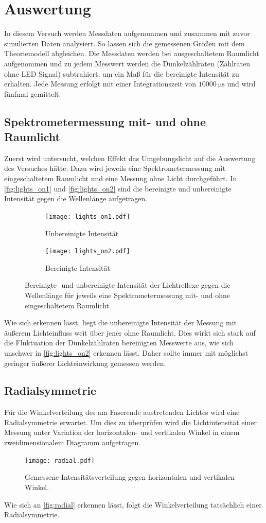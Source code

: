 \section{Auswertung}
\label{sec:Auswertung}
In diesem Versuch werden Messdaten aufgenommen und zusammen mit zuvor simulierten Daten analysiert. So lassen sich die gemessenen Größen mit dem Theoriemodell abgleichen.
Die Messdaten werden bei ausgeschaltetem Raumlicht aufgenommen und zu jedem Messwert werden die Dunkelzählraten (Zählraten ohne LED Signal) subtrahiert, um 
ein Maß für die bereinigte Intensität zu erhalten. Jede Messung erfolgt mit einer Integrationszeit von $\qty{10000}{\micro\second}$ und wird fünfmal gemittelt.

\subsection{Spektrometermessung mit- und ohne Raumlicht}
\label{sec:Spektrometermessung}
Zuerst wird untersucht, welchen Effekt das Umgebungslicht auf die Auswertung des Versuches hätte. Dazu wird jeweils eine Spektrometermessung mit eingeschaltetem Raumlicht 
und eine Messung ohne Licht durchgeführt. In \autoref{fig:lights_on1} und \autoref{fig:lights_on2} sind die bereinigte und unbereinigte Intensität gegen die Wellenlänge aufgetragen.
\begin{figure}
  \centering
  \begin{subfigure}{0.7\textwidth}
    \texttt{[image: lights\_on1.pdf]}
    \caption{Unbereinigte Intensität}
    \label{fig:lights_on1}
  \end{subfigure}
  \hfill
  \begin{subfigure}{0.7\textwidth}
    \texttt{[image: lights\_on2.pdf]}
    \caption{Bereinigte Intensität}
    \label{fig:lights_on2}
  \end{subfigure}
  \caption{Bereinigte- und unbereinigte Intensität der Lichtreflexe gegen die Wellenlänge für jeweils eine Spektrometermessung mit- und ohne eingeschaltetem Raumlicht.}
  \label{fig:lights_on}
\end{figure}
Wie sich erkennen lässt, liegt die unbereinigte Intensität der Messung mit äußerem Lichteinfluss weit über jener ohne Raumlicht. Dies wirkt sich stark auf die Fluktuation 
der Dunkelzählraten bereinigten Messwerte aus, wie sich unschwer in \autoref{fig:lights_on2} erkennen lässt. Daher sollte immer mit möglichst geringer äußerer Lichteinwirkung gemessen werden.

\subsection{Radialsymmetrie}
Für die Winkelverteilung des am Faserende austretenden Lichtes wird eine Radialsymmetrie erwartet. Um dies zu überprüfen wird die Lichtintensität einer Messung unter Variation
der horizontalen- und vertikalen Winkel in einem zweidimensionalem Diagramm aufgetragen.
\begin{figure}
  \centering
  \texttt{[image: radial.pdf]}
  \caption{Gemessene Intensitätsverteilung gegen horizontalen und vertikalen Winkel.}
  \label{fig:radial}
\end{figure}
Wie sich an \autoref{fig:radial} erkennen lässt, folgt die Winkelverteilung tatsächlich einer Radialsymmetrie.

